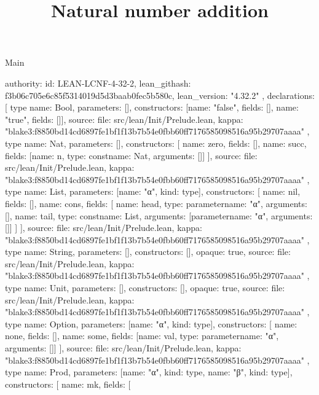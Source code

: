 \begin{lexlean}{Main}
\title{Natural number addition}
\begin{toolingmodule}
{
  authority: {
    id: LEAN-LCNF-4-32-2,
    lean_githash: f3b06c705e6c85f5314019d5d3baab0fec5b580c,
    lean_version: "4.32.2"
  },
  declarations: [
    type{
      name: Bool,
      parameters: [],
      constructors: [{name: "false", fields: []}, {name: "true", fields: []}],
      source: {
        file: src/lean/Init/Prelude.lean,
        kappa: "blake3:f8850bd14cd6897fe1bf1f13b7b54e0fbb60ff7176585098516a95b29707aaaa"
      }
    },
    type{
      name: Nat,
      parameters: [],
      constructors: [
        {name: zero, fields: []},
        {name: succ, fields: [{name: n, type: const{name: Nat, arguments: []}}]}
      ],
      source: {
        file: src/lean/Init/Prelude.lean,
        kappa: "blake3:f8850bd14cd6897fe1bf1f13b7b54e0fbb60ff7176585098516a95b29707aaaa"
      }
    },
    type{
      name: List,
      parameters: [{name: "α", kind: type{}}],
      constructors: [
        {name: nil, fields: []},
        {
          name: cons,
          fields: [
            {name: head, type: parameter{name: "α", arguments: []}},
            {name: tail, type: const{name: List, arguments: [parameter{name: "α", arguments: []}]}}
          ]
        }
      ],
      source: {
        file: src/lean/Init/Prelude.lean,
        kappa: "blake3:f8850bd14cd6897fe1bf1f13b7b54e0fbb60ff7176585098516a95b29707aaaa"
      }
    },
    type{
      name: String,
      parameters: [],
      constructors: [],
      opaque: true,
      source: {
        file: src/lean/Init/Prelude.lean,
        kappa: "blake3:f8850bd14cd6897fe1bf1f13b7b54e0fbb60ff7176585098516a95b29707aaaa"
      }
    },
    type{
      name: Unit,
      parameters: [],
      constructors: [],
      opaque: true,
      source: {
        file: src/lean/Init/Prelude.lean,
        kappa: "blake3:f8850bd14cd6897fe1bf1f13b7b54e0fbb60ff7176585098516a95b29707aaaa"
      }
    },
    type{
      name: Option,
      parameters: [{name: "α", kind: type{}}],
      constructors: [
        {name: none, fields: []},
        {name: some, fields: [{name: val, type: parameter{name: "α", arguments: []}}]}
      ],
      source: {
        file: src/lean/Init/Prelude.lean,
        kappa: "blake3:f8850bd14cd6897fe1bf1f13b7b54e0fbb60ff7176585098516a95b29707aaaa"
      }
    },
    type{
      name: Prod,
      parameters: [{name: "α", kind: type{}}, {name: "β", kind: type{}}],
      constructors: [
        {
          name: mk,
          fields: [
}}}
\end{toolingmodule}
\end{lexlean}
